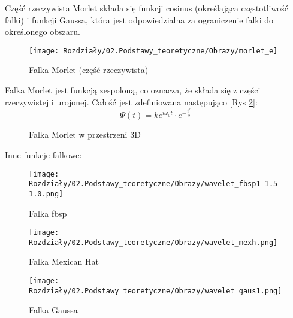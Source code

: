 Część rzeczywista Morlet składa się funkcji cosinus (określająca częstotliwość falki) i funkcji Gaussa, która jest odpowiedzialna za ograniczenie falki do określonego obszaru.

\begin{figure}[ht]
    \centering
    \begin{minipage}[t]{0.7\linewidth}
        \texttt{[image: Rozdziały/02.Podstawy\_teoretyczne/Obrazy/morlet\_e]}
        \caption{Falka Morlet (część rzeczywista)}
        \label{fig:image29}
    \end{minipage}
\end{figure}

Falka Morlet jest funkcją zespoloną, co oznacza, że składa się z części rzeczywistej i urojonej. Całość jest zdefiniowana następująco [Rys \ref{fig:image30}]:
\begin{equation}
    \Psi(t)=k e^{i \omega_0 t} \cdot e^{-\frac{t^2}{2}}
\end{equation}

\begin{figure}[H]
    \centering
    \caption{Falka Morlet w przestrzeni 3D}
    \label{fig:image30}
\end{figure}

Inne funkcje falkowe:

\begin{figure}[ht]
    \centering
    \begin{minipage}[t]{0.3\linewidth}
        \texttt{[image: Rozdziały/02.Podstawy\_teoretyczne/Obrazy/wavelet\_fbsp1-1.5-1.0.png]}
        \caption{Falka fbsp}
        \label{fig:image31}
    \end{minipage}
    \hspace{0.5cm}
    \begin{minipage}[t]{0.3\linewidth}
        \texttt{[image: Rozdziały/02.Podstawy\_teoretyczne/Obrazy/wavelet\_mexh.png]}
        \caption{Falka Mexican Hat}
        \label{fig:image32}
    \end{minipage}
    \hspace{0.5cm}
    \begin{minipage}[t]{0.3\linewidth}
        \texttt{[image: Rozdziały/02.Podstawy\_teoretyczne/Obrazy/wavelet\_gaus1.png]}
        \caption{Falka Gaussa}
        \label{fig:image33}
    \end{minipage}
\end{figure}


